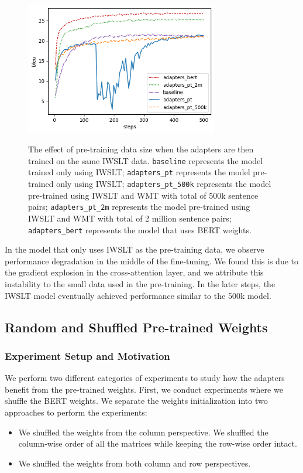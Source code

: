 \begin{figure}[h]
    {\includegraphics[width=0.75\textwidth]{img/adapterscomparison.png}}
    \centering
    \caption[The effect of pre-training data size when the adapters are then trained on the same IWSLT data.]{
        The effect of pre-training data size when the adapters are then trained on the same IWSLT data. \texttt{baseline} represents the model trained only using IWSLT; \texttt{adapters\_pt} represents the model pre-trained only using IWSLT; \texttt{adapters\_pt\_500k} represents the model pre-trained using IWSLT and WMT with total of 500k sentence pairs; \texttt{adapters\_pt\_2m} represents the model pre-trained using IWSLT and WMT with total of 2 million sentence pairs; \texttt{adapters\_bert} represents the model that uses BERT weights.}
    \label{img:adpcomp}
\end{figure}

In the model that only uses IWSLT as the pre-training data, we observe performance degradation in the middle of the fine-tuning. We found this is due to the gradient explosion in the cross-attention layer, and we attribute this instability to the small data used in the pre-training. In the later steps, the IWSLT model eventually achieved performance similar to the 500k model.

\subsection{Random and Shuffled Pre-trained Weights}
\label{ssec:randshuff}
\subsubsection{Experiment Setup and Motivation}
We perform two different categories of experiments to study how the adapters benefit from the pre-trained weights.
First, we conduct experiments where we shuffle the BERT weights. We separate the weights initialization into two approaches to perform the experiments:
\begin{itemize}
    \item We shuffled the weights from the column perspective. We shuffled the column-wise order of all the matrices while keeping the row-wise order intact.
    \item We shuffled the weights from both column and row perspectives.
\end{itemize}

